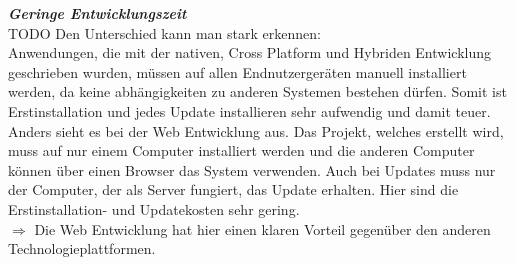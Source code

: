 \documentclass[ngerman]{article}
\begin{document}
    \textbf{\textit{Geringe Entwicklungszeit}}\\
    TODO
    Den Unterschied kann man stark erkennen:\\
    \indent Anwendungen, die mit der nativen, Cross Platform und Hybriden Entwicklung geschrieben wurden, müssen auf allen Endnutzergeräten manuell installiert werden, da keine abhängigkeiten zu anderen Systemen bestehen dürfen. Somit ist Erstinstallation und jedes Update installieren sehr aufwendig und damit teuer.\\
    \indent Anders sieht es bei der Web Entwicklung aus. Das Projekt, welches erstellt wird, muss auf nur einem Computer installiert werden und die anderen Computer können über einen Browser das System verwenden. Auch bei Updates muss nur der Computer, der als Server fungiert, das Update erhalten. Hier sind die Erstinstallation- und Updatekosten sehr gering.\\
    \indent$\Rightarrow$ Die Web Entwicklung hat hier einen klaren Vorteil gegenüber den anderen Technologieplattformen.\\\\
\end{document}

